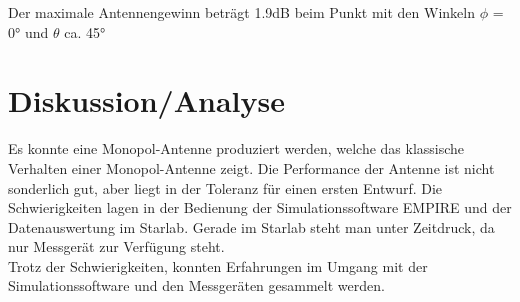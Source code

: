 Der maximale Antennengewinn beträgt 1.9dB beim Punkt mit den Winkeln $\phi$ = 0° und $\theta$ ca. 45°\\

\newpage

\section{Diskussion/Analyse}
Es konnte eine Monopol-Antenne produziert werden, welche das klassische Verhalten einer Monopol-Antenne zeigt. Die Performance der Antenne ist nicht sonderlich gut, aber liegt in der Toleranz für einen ersten Entwurf. Die Schwierigkeiten lagen in der Bedienung der Simulationssoftware EMPIRE und der Datenauswertung im Starlab. Gerade im Starlab steht man unter Zeitdruck, da nur Messgerät zur Verfügung steht.\\
Trotz der Schwierigkeiten, konnten Erfahrungen im Umgang mit der Simulationssoftware und den Messgeräten gesammelt werden.

